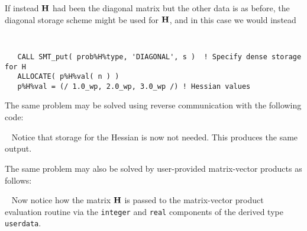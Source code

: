 \documentclass{galahad}
\begin{document}
If instead ${\mathbf{H}}$ had been the diagonal matrix
but the other data is as before, the diagonal storage scheme 
might be used for ${\mathbf{H}}$, and in this case we would instead 
{\tt \small
\begin{verbatim}
   CALL SMT_put( prob%H%type, 'DIAGONAL', s )  ! Specify dense storage for H
   ALLOCATE( p%H%val( n ) )
   p%H%val = (/ 1.0_wp, 2.0_wp, 3.0_wp /) ! Hessian values
\end{verbatim}
}
\noindent

The same problem may be solved using reverse communication with the
following code:

{\tt \small
\VerbatimInput{\packageexampleb}
}
\noindent
Notice that storage for the Hessian is now not needed.
This produces the same output.

The same problem may also be solved by user-provided matrix-vector
products as follows:

{\tt \small
\VerbatimInput{\packageexamplec}
}
\noindent
Now notice how the matrix ${\mathbf{H}}$ is passed to the matrix-vector product 
evaluation routine via the {\tt integer} and 
{\tt real} components of the derived type {\tt userdata}.

\end{document}
